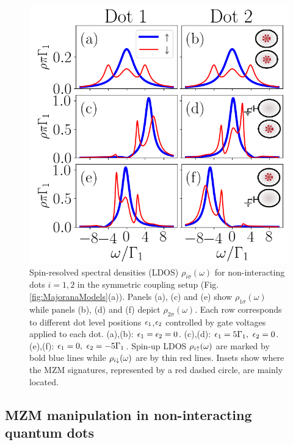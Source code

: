 \documentclass[showpacs,aps,prb,reprint,superscriptaddress]{revtex4-2}
\begin{document}
    \begin{figure}[bt]
        \begin{center}
        \includegraphics[scale=0.48]{Graficos/t1=t2.png}
       \caption{ \label{fig:t1EQt2}  Spin-resolved spectral densities (LDOS) $\rho_{i \sigma}(\omega)$ for non-interacting  dots $i=1,2$ in the symmetric coupling setup (Fig.\ref{fig:MajoranaModels}(a)). Panels (a), (c) and (e) show $\rho_{1 \sigma}(\omega)$ while panels (b), (d) and  (f) depict $\rho_{2 \sigma}(\omega)$. Each row corresponds to different dot level positions $\epsilon_1$,$\epsilon_2$ controlled by gate voltages applied to each dot. (a),(b): $\epsilon_1=\epsilon_2=0$. (c),(d): $\epsilon_1=5\Gamma_1, \ \epsilon_2 =0$.  (e),(f): $\epsilon_1=0, \ \epsilon_2 =-5\Gamma_1$.  Spin-up LDOS $\rho_{i \uparrow}(\omega)$ are marked by bold blue lines while $\rho_{i \downarrow}(\omega)$ are by thin red lines. Insets show where the MZM signatures, represented by a red dashed circle, are mainly located. 
        }
        \end{center}
    \end{figure}



     \subsection{MZM manipulation in non-interacting quantum dots \label{subsect:non-int}}
\end{document}
